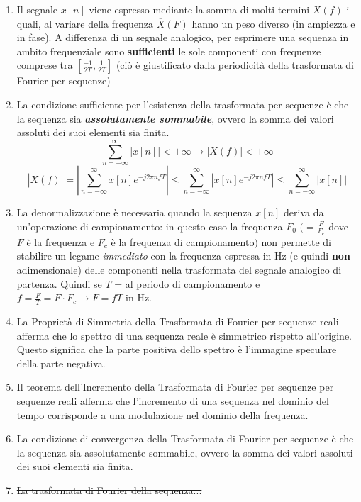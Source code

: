 \documentclass[
]{article}
\begin{document}
\begin{enumerate}
\def\labelenumi{\arabic{enumi}.}
\setcounter{enumi}{5}
\item
  Il segnale \(x[n]\) viene espresso mediante la somma di molti termini
  \(X(f)\) i quali, al variare della frequenza \(\overline{X}(F)\) hanno
  un peso diverso (in ampiezza e in fase). A differenza di un segnale
  analogico, per esprimere una sequenza in ambito frequenziale sono
  \textbf{sufficienti} le sole componenti con frequenze comprese tra
  \([\frac{-1}{2T}, \frac{1}{2T}]\) (ciò è giustificato dalla
  periodicità della trasformata di Fourier per sequenze)
\item
  La condizione sufficiente per l'esistenza della trasformata per
  sequenze è che la sequenza sia \textbf{\emph{assolutamente
  sommabile}}, ovvero la somma dei valori assoluti dei suoi elementi sia
  finita.
  \[\displaystyle \sum_{n=-\infty}^{\infty} |x[n]| < + \infty \to |X(f)| < +\infty\]
  \[|\overline{X}(f)| = |\sum_{n=-\infty}^{\infty} x[n] e^{-j2\pi nfT}| \leq \sum_{n=-\infty}^{\infty} | x[n] e^{-j2\pi nfT}| \leq 
    \sum_{n=-\infty}^{\infty} |x[n]|\]
\item
  La denormalizzazione è necessaria quando la sequenza \(x[n]\) deriva
  da un'operazione di campionamento: in questo caso la frequenza \(F_0\)
  \((= \frac{F}{F_c}\) dove \(F\) è la frequenza e \(F_c\) è la
  frequenza di campionamento\()\) non permette di stabilire un legame
  \emph{immediato} con la frequenza espressa in Hz (e quindi
  \textbf{non} adimensionale) delle componenti nella trasformata del
  segnale analogico di partenza. Quindi se \(T\) = al periodo di
  campionamento e \(f=\frac{F}{T}=F\cdot F_c \to F=fT\) in Hz.
\item
  La Proprietà di Simmetria della Trasformata di Fourier per sequenze
  reali afferma che lo spettro di una sequenza reale è simmetrico
  rispetto all'origine. Questo significa che la parte positiva dello
  spettro è l'immagine speculare della parte negativa.
\item
  Il teorema dell'Incremento della Trasformata di Fourier per sequenze
  per sequenze reali afferma che l'incremento di una sequenza nel
  dominio del tempo corrisponde a una modulazione nel dominio della
  frequenza.
\item
  La condizione di convergenza della Trasformata di Fourier per sequenze
  è che la sequenza sia assolutamente sommabile, ovvero la somma dei
  valori assoluti dei suoi elementi sia finita.
\item
  \st{La trasformata di Fourier della sequenza...}

\end{enumerate}
\end{document}
